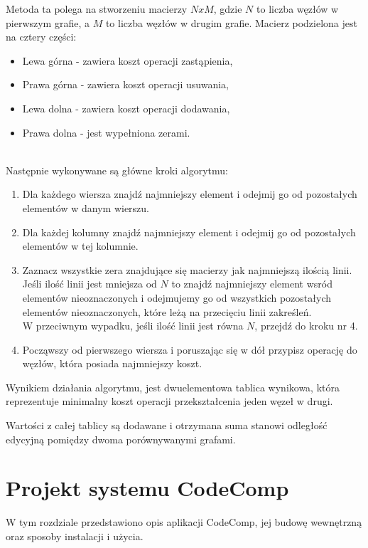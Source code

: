 \documentclass[a4paper,12pt]{article}
\begin{document}
Metoda ta polega na stworzeniu macierzy $NxM$, gdzie $N$ to liczba węzłów w pierwszym grafie, a $M$ to liczba węzłów w drugim grafie. Macierz podzielona jest na cztery części:
\begin{itemize}
\item Lewa górna - zawiera koszt operacji zastąpienia,
\item Prawa górna - zawiera koszt operacji usuwania,
\item Lewa dolna - zawiera koszt operacji dodawania,
\item Prawa dolna - jest wypełniona zerami.
\end{itemize}
\\
Następnie wykonywane są główne kroki algorytmu:
\begin{enumerate}
\item Dla każdego wiersza znajdź najmniejszy element i odejmij go od pozostałych elementów w danym wierszu.
\item Dla każdej kolumny znajdź najmniejszy element i odejmij go od pozostałych elementów w tej kolumnie.
\item Zaznacz wszystkie zera znajdujące się macierzy jak najmniejszą ilością linii. \\
Jeśli ilość linii jest mniejsza od $N$ to znajdź najmniejszy element wsród elementów nieoznaczonych i odejmujemy go od wszystkich pozostałych elementów nieoznaczonych, które leżą na przecięciu linii zakreśleń. \\
W przeciwnym wypadku, jeśli ilość linii jest równa $N$, przejdź do kroku nr 4.
\item Począwszy od pierwszego wiersza i poruszając się w dół przypisz operację do węzłów, która posiada najmniejszy koszt.
\end{enumerate}

Wynikiem działania algorytmu, jest dwuelementowa tablica wynikowa, która reprezentuje minimalny koszt operacji przekształcenia jeden węzeł w drugi.

Wartości z całej tablicy są dodawane i otrzymana suma stanowi odległość edycyjną pomiędzy dwoma porównywanymi grafami.

\newpage

\section{Projekt systemu CodeComp}

W tym rozdziale przedstawiono opis aplikacji CodeComp, jej budowę wewnętrzną oraz sposoby instalacji i użycia.
\end{document}

